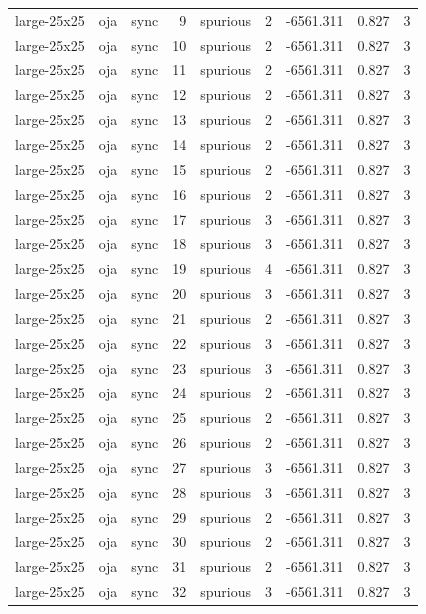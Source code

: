 \begin{tabular}{lllrlrrrr}
large-25x25 & oja & sync & 9 & spurious & 2 & -6561.311 & 0.827 & 3 \\
large-25x25 & oja & sync & 10 & spurious & 2 & -6561.311 & 0.827 & 3 \\
large-25x25 & oja & sync & 11 & spurious & 2 & -6561.311 & 0.827 & 3 \\
large-25x25 & oja & sync & 12 & spurious & 2 & -6561.311 & 0.827 & 3 \\
large-25x25 & oja & sync & 13 & spurious & 2 & -6561.311 & 0.827 & 3 \\
large-25x25 & oja & sync & 14 & spurious & 2 & -6561.311 & 0.827 & 3 \\
large-25x25 & oja & sync & 15 & spurious & 2 & -6561.311 & 0.827 & 3 \\
large-25x25 & oja & sync & 16 & spurious & 2 & -6561.311 & 0.827 & 3 \\
large-25x25 & oja & sync & 17 & spurious & 3 & -6561.311 & 0.827 & 3 \\
large-25x25 & oja & sync & 18 & spurious & 3 & -6561.311 & 0.827 & 3 \\
large-25x25 & oja & sync & 19 & spurious & 4 & -6561.311 & 0.827 & 3 \\
large-25x25 & oja & sync & 20 & spurious & 3 & -6561.311 & 0.827 & 3 \\
large-25x25 & oja & sync & 21 & spurious & 2 & -6561.311 & 0.827 & 3 \\
large-25x25 & oja & sync & 22 & spurious & 3 & -6561.311 & 0.827 & 3 \\
large-25x25 & oja & sync & 23 & spurious & 3 & -6561.311 & 0.827 & 3 \\
large-25x25 & oja & sync & 24 & spurious & 2 & -6561.311 & 0.827 & 3 \\
large-25x25 & oja & sync & 25 & spurious & 2 & -6561.311 & 0.827 & 3 \\
large-25x25 & oja & sync & 26 & spurious & 2 & -6561.311 & 0.827 & 3 \\
large-25x25 & oja & sync & 27 & spurious & 3 & -6561.311 & 0.827 & 3 \\
large-25x25 & oja & sync & 28 & spurious & 3 & -6561.311 & 0.827 & 3 \\
large-25x25 & oja & sync & 29 & spurious & 2 & -6561.311 & 0.827 & 3 \\
large-25x25 & oja & sync & 30 & spurious & 2 & -6561.311 & 0.827 & 3 \\
large-25x25 & oja & sync & 31 & spurious & 2 & -6561.311 & 0.827 & 3 \\
large-25x25 & oja & sync & 32 & spurious & 3 & -6561.311 & 0.827 & 3 \\

\end{tabular}
